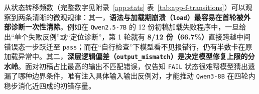 从状态转移频数（完整数字见附录~\ref{app:stats} 表~\ref{tab:app-f-transitions}）可以观察到两条清晰的微观规律：其一，\textbf{语法与加载期崩溃（\texttt{load}）最容易在首轮被外部诊断一次性清除}。例如在 \texttt{Qwen2.5-7B} 的 12 份初稿加载失败程序中，一旦给出“单个失败反例”或“定位诊断”，第 1 轮就有 \textbf{8/12 份（66.7\%）}直接跨越中间错误态一步跃迁至 \texttt{pass}；而在“自行检查”下模型看不见报错行，仍有半数卡在原加载异常中。其二，\textbf{深层逻辑偏差（\texttt{output\_mismatch}）是决定模型修复上限的分水岭}。面对初稿占比最高的输出不匹配错误，仅告知 \texttt{FAIL} 状态很难帮模型猜出遗漏了哪种边界条件，唯有注入具体输入输出反例对，才能推动 \texttt{Qwen3-8B} 在四轮内稳步消化近四成的初错存量。
